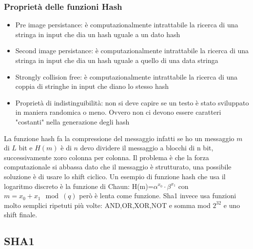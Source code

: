 \documentclass[10pt,a4paper]{article}
\begin{document}
\subsubsection{Proprietà delle funzioni Hash}
\begin{itemize}
\item Pre image persistance: è computazionalmente intrattabile la ricerca di una stringa in input che dia un hash uguale a un dato hash
\item Second image persistance: è computazionalmente intrattabile la ricerca di una stringa in input che dia un hash uguale a quello di una data stringa
\item Strongly collision free: è computazionalmente intrattabile la ricerca di una coppia di stringhe in input che diano lo stesso hash
\item Proprietà di indistinguibilità: non si deve capire se un testo è stato sviluppato in maniera randomica o meno. Ovvero non ci devono essere caratteri "costanti" nella generazione degli hash
\end{itemize}

La funzione hash fa la compressione del messaggio infatti se ho un messaggio $m$ di $L$ bit e $H(m)$ è di $n$ devo dividere il messaggio a blocchi di n bit, successivamente  xoro colonna per colonna. Il problema è che la forza computazionale si abbassa dato che il messaggio è strutturato, una possibile soluzione è di usare lo shift ciclico. Un esempio di funzione hash che usa il logaritmo discreto è la funzione di Chaun: H(m)=$\alpha^{x_0}\cdot\beta^{x_1}$ con $m=x_0+x_1\mod(q)$ però è lenta come funzione. Sha1 invece usa funzioni molto semplici ripetuti più volte: AND,OR,XOR,NOT e somma mod $2^{32}$ e uno shift finale.

\subsection{SHA1}
\end{document}
